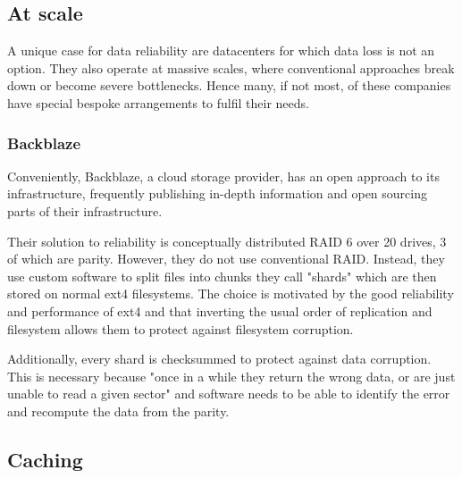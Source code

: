        \subsection{At scale}

            A unique case for data reliability are datacenters for which data
            loss is not an option. They also operate at massive scales, where
            conventional approaches break down or become severe bottlenecks.
            Hence many, if not most, of these companies have special bespoke
            arrangements to fulfil their needs.

            \subsubsection{Backblaze}

                Conveniently, Backblaze, a cloud storage provider, has an open
                approach to its infrastructure, frequently publishing in-depth
                information and open sourcing parts of their infrastructure.

                Their solution \cite{Backblaze_arch} to reliability is
                conceptually distributed RAID 6 over 20 drives, 3 of which are
                parity. However, they do not use conventional RAID. Instead,
                they use custom software to split files into chunks they call
                "shards" which are then stored on normal ext4 filesystems. The
                choice is motivated by the good reliability and performance of
                ext4 and that inverting the usual order of replication and
                filesystem allows them to protect against filesystem
                corruption.

                Additionally, every shard is checksummed to protect against
                data corruption. This is necessary because "once in a while
                they return the wrong data, or are just unable to read a given
                sector" \cite{Backblaze_arch} and software needs to be able to
                identify the error and recompute the data from the parity.

        \subsection{Caching}



